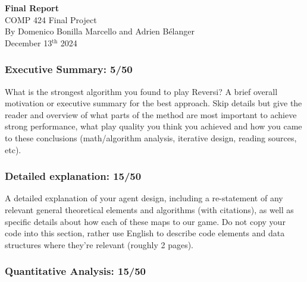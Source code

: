 \documentclass[12pt, letterpaper]{article}
\begin{document}
\begin{titlepage}
    \centering
    \vspace*{2in}
    {\LARGE \textbf{Final Report}}\\
    \vspace*{0.5in}
    {\large COMP 424 Final Project}\\[4in]
    \normalsize
    By Domenico Bonilla Marcello and Adrien Bélanger\\ [3em]
    December 13$^{\text{th}}$ 2024
\end{titlepage}

\subsubsection*{Executive Summary: 5/50}
    
    What is the strongest algorithm you found to play Reversi? 
    A brief overall motivation or executive summary for the best approach. 
    Skip details but give the reader and overview of what parts of 
    the method are most important to achieve strong performance, 
    what play quality you think you achieved and how you came to 
    these conclusions (math/algorithm analysis, iterative design, 
    reading sources, etc).
    



\subsubsection*{Detailed explanation: 15/50}
    
    A detailed explanation of your agent design, including a re-statement of any relevant general 
    theoretical elements and algorithms (with citations), as well as specific details about
    how each of these maps to our game. Do not copy your code into this section, 
    rather use English to describe code elements and data structures where they're 
    relevant  (roughly 2 pages).
    

\subsubsection*{Quantitative Analysis: 15/50}
    
\end{document}
